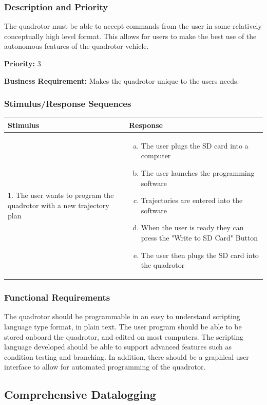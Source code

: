 \documentclass[english]{article}
\numberwithin{equation}{section} %
\begin{document}
\subsubsection{Description and Priority}
The quadrotor must be able to accept commands from the user in some relatively conceptually high level format. This allows for users to make the best use of the autonomous features of the quadrotor vehicle.

\textbf{Priority:} 3

\textbf{Business Requirement:} Makes the quadrotor unique to the users needs.

\subsubsection{Stimulus/Response Sequences}

\begin{longtable}{p{3cm} | p{8.5cm}}
\hline
\textbf{Stimulus} & \textbf{Response}\\
\hline
1. The user wants to program the quadrotor with a new trajectory plan &
\begin{enumerate}[(a)]\itemsep1pt %
\item The user plugs the SD card into a computer
\item The user launches the programming software
\item Trajectories are entered into the software
\item When the user is ready they can press the "Write to SD Card" Button
\item The user then plugs the SD card into the quadrotor
\end{enumerate}
\\ 
\hline
\end{longtable}
\subsubsection{Functional Requirements}
The quadrotor should be programmable in an easy to understand scripting language type format, in plain text. The user program should be able to be stored onboard the quadrotor, and edited on most computers. The scripting language developed should be able to support advanced features such as condition testing and branching. In addition, there should be a graphical user interface to allow for automated programming of the quadrotor.
\bigskip

\subsection{Comprehensive Datalogging}
\end{document}
